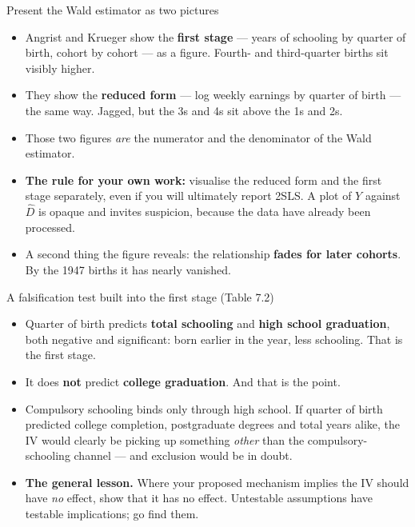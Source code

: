 \documentclass[
  11pt,
  ignorenonframetext,
  aspectratio=169,
]{beamer}
\providecommand{\tightlist}{%
  \setlength{\itemsep}{0pt}\setlength{\parskip}{0pt}}
\begin{document}
\begin{frame}{Present the Wald estimator as two pictures}
\protect{}\label{present-the-wald-estimator-as-two-pictures}
\begin{itemize}
\tightlist
\item
  Angrist and Krueger show the \textbf{first stage} --- years of
  schooling by quarter of birth, cohort by cohort --- as a figure.
  Fourth- and third-quarter births sit visibly higher.
\item
  They show the \textbf{reduced form} --- log weekly earnings by quarter
  of birth --- the same way. Jagged, but the 3s and 4s sit above the 1s
  and 2s.
\item
  Those two figures \emph{are} the numerator and the denominator of the
  Wald estimator.
\item
  \textbf{The rule for your own work:} visualise the reduced form and
  the first stage separately, even if you will ultimately report 2SLS. A
  plot of \(Y\) against \(\hat D\) is opaque and invites suspicion,
  because the data have already been processed.
\item
  A second thing the figure reveals: the relationship \textbf{fades for
  later cohorts}. By the 1947 births it has nearly vanished.
\end{itemize}
\end{frame}

\begin{frame}{A falsification test built into the first stage (Table
7.2)}
\protect{}\label{a-falsification-test-built-into-the-first-stage-table-7.2}
\begin{itemize}
\tightlist
\item
  Quarter of birth predicts \textbf{total schooling} and \textbf{high
  school graduation}, both negative and significant: born earlier in the
  year, less schooling. That is the first stage.
\item
  It does \textbf{not} predict \textbf{college graduation}. And that is
  the point.
\item
  Compulsory schooling binds only through high school. If quarter of
  birth predicted college completion, postgraduate degrees and total
  years alike, the IV would clearly be picking up something \emph{other}
  than the compulsory-schooling channel --- and exclusion would be in
  doubt.
\item
  \textbf{The general lesson.} Where your proposed mechanism implies the
  IV should have \emph{no} effect, show that it has no effect.
  Untestable assumptions have testable implications; go find them.
\end{itemize}
\end{frame}
\end{document}
